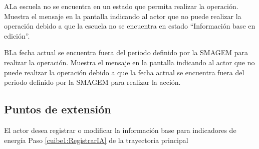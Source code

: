  
  \begin{UCtrayectoriaA}{A}{La escuela no se encuentra en un estado que permita realizar la operación.}
    \UCpaso[\UCsist] Muestra el mensaje  en la pantalla  indicando al actor que no puede realizar la operación debido a que la escuela no se encuentra en estado ``Información base en edición''. 
 \end{UCtrayectoriaA}

     \begin{UCtrayectoriaA}{B}{La fecha actual se encuentra fuera del periodo definido por la SMAGEM para realizar la operación.}
    \UCpaso[\UCsist] Muestra el mensaje  en la pantalla  indicando al actor que no puede realizar la operación debido a que la fecha actual se encuentra fuera del periodo definido por la SMAGEM para realizar la acción. 
 \end{UCtrayectoriaA}

\subsection{Puntos de extensión}

\UCExtensionPoint
{El actor desea registrar o modificar la información base para indicadores de energía}
{ Paso \ref{cuibe1:RegistrarIA} de la trayectoria principal}
{}
